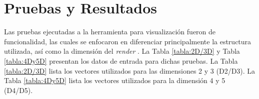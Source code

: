 \documentclass{llncs}
\begin{document}

\section{Pruebas y Resultados}
\label{Pruebasyresultados}

Las pruebas ejecutadas a la herramienta para visualización fueron de funcionalidad, las cuales se enfocaron en diferenciar principalmente la estructura utilizada, así como la dimensión del \textit{render} \cite{b17}.
La Tabla \ref{tabla:2D/3D} y Tabla \ref{tabla:4Dy5D} presentan los datos de entrada para dichas pruebas. La Tabla \ref{tabla:2D/3D} lista los vectores utilizados para las dimensiones 2 y 3 (D2/D3). La Tabla \ref{tabla:4Dy5D} lista los vectores utilizados para la dimensión 4 y 5 (D4/D5).
\end{document}

